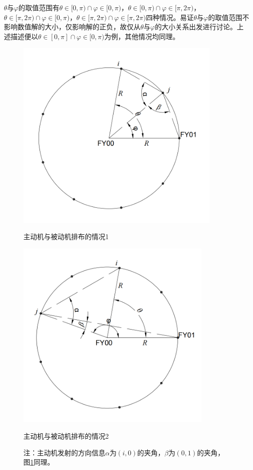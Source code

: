 \documentclass[withoutpreface,bwprint]{cumcmthesis} %
\begin{document}
$\theta$与$\varphi$的取值范围有$\theta \in[0,\pi)\cap \varphi \in[0,\pi)$，$\theta \in[0,\pi)\cap \varphi \in[\pi,2\pi)$，$\theta \in[\pi,2\pi)\cap \varphi \in[0,\pi)$，$\theta \in[\pi,2\pi)\cap \varphi \in[\pi,2\pi)$四种情况。易证$\theta$与$\varphi$的取值范围不影响数值解的大小，仅影响解的正负，故仅从$\theta$与$\varphi$的大小关系出发进行讨论。上述描述便以$\theta \in[0,\pi]\cap \varphi \in[0,\pi)$为例，其他情况均同理。


\begin{figure}[H]
    \centering
    \begin{minipage}{0.49\textwidth}
        \centering
        \includegraphics[width=0.9\textwidth]{../../figure/q1_1.png} 
        \caption{主动机与被动机排布的情况1}
        \label{q1_1}
    \end{minipage}
    \begin{minipage}{0.49\textwidth}
        \centering
        \includegraphics[width=0.86\textwidth]{../../figure/q1_2.png} 
        \caption{主动机与被动机排布的情况2}
        \label{q1_2}   
    \end{minipage}
    \caption*{\small 注：主动机发射的方向信息$\alpha$为$(i,0)$的夹角，$\beta$为$(0,1)$的夹角，图\ref{q1_2}同理。}
\end{figure}
\end{document}
